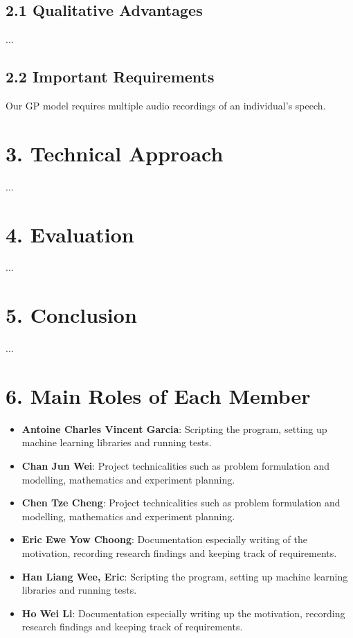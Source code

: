 \documentclass{article}
\begin{document}
	\subsection{2.1  Qualitative Advantages}
	... \\

	\subsection{2.2  Important Requirements}
	 Our GP model requires multiple audio recordings of an individual's speech. \\

	\section{3.  Technical Approach}
	... \\	

	\section{4.  Evaluation}
	... \\

	\section{5.  Conclusion}	
	... \\

	\section{6.  Main Roles of Each Member}
	\begin{itemize}
		\item \textbf{Antoine Charles Vincent Garcia}: 
		Scripting the program, setting up machine learning libraries and running tests.
		\item \textbf{Chan Jun Wei}: 
		Project technicalities such as problem formulation and modelling, mathematics and experiment planning.
		\item \textbf{Chen Tze Cheng}: 
		Project technicalities such as problem formulation and modelling, mathematics and experiment planning.
		\item \textbf{Eric Ewe Yow Choong}: 
		Documentation especially writing of the motivation, recording research findings and keeping track of requirements.
		\item \textbf{Han Liang Wee, Eric}: 
		Scripting the program, setting up machine learning libraries and running tests.
		\item \textbf{Ho Wei Li}: 
		Documentation especially writing up the motivation, recording research findings and keeping track of requirements.
	\end{itemize}
	
\end{document}

